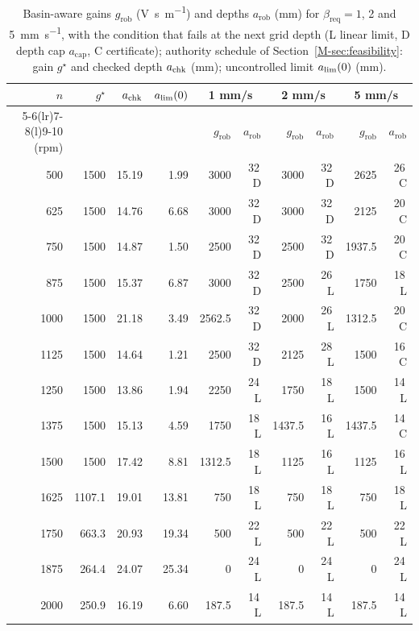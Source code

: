 \begin{table}[!htbp]
  \centering
  \caption{Basin-aware gains $g_{\mathrm{rob}}$ (\si{\volt\second\per\metre}) and depths $a_{\mathrm{rob}}$ (\si{\milli\metre}) for $\beta_{\mathrm{req}}=1$, 2 and \SI{5}{\milli\metre\per\second}, with the condition that fails at the next grid depth (L linear limit, D depth cap $a_{\mathrm{cap}}$, C certificate); authority schedule of Section~\ref{M-sec:feasibility}: gain $g^\star$ and checked depth $a_{\mathrm{chk}}$ (\si{\milli\metre}); uncontrolled limit $a_{\lim}(0)$ (\si{\milli\metre}).}
  \label{tab:supp-ba}
  \small
  \begin{tabular}{@{}rrrrrrrrrr@{}}
    \toprule
    $n$ & $g^\star$ & $a_{\mathrm{chk}}$ & $a_{\lim}(0)$ & \multicolumn{2}{c}{1 mm/s} & \multicolumn{2}{c}{2 mm/s} & \multicolumn{2}{c}{5 mm/s}\\
    \cmidrule(lr){5-6}\cmidrule(lr){7-8}\cmidrule(l){9-10}
    (rpm) & & & & $g_{\mathrm{rob}}$ & $a_{\mathrm{rob}}$ & $g_{\mathrm{rob}}$ & $a_{\mathrm{rob}}$ & $g_{\mathrm{rob}}$ & $a_{\mathrm{rob}}$\\
    \midrule
    500 & 1500 & 15.19 & 1.99 & 3000 & 32\,D & 3000 & 32\,D & 2625 & 26\,C\\
    625 & 1500 & 14.76 & 6.68 & 3000 & 32\,D & 3000 & 32\,D & 2125 & 20\,C\\
    750 & 1500 & 14.87 & 1.50 & 2500 & 32\,D & 2500 & 32\,D & 1937.5 & 20\,C\\
    875 & 1500 & 15.37 & 6.87 & 3000 & 32\,D & 2500 & 26\,L & 1750 & 18\,L\\
    1000 & 1500 & 21.18 & 3.49 & 2562.5 & 32\,D & 2000 & 26\,L & 1312.5 & 20\,C\\
    1125 & 1500 & 14.64 & 1.21 & 2500 & 32\,D & 2125 & 28\,L & 1500 & 16\,C\\
    1250 & 1500 & 13.86 & 1.94 & 2250 & 24\,L & 1750 & 18\,L & 1500 & 14\,L\\
    1375 & 1500 & 15.13 & 4.59 & 1750 & 18\,L & 1437.5 & 16\,L & 1437.5 & 14\,C\\
    1500 & 1500 & 17.42 & 8.81 & 1312.5 & 18\,L & 1125 & 16\,L & 1125 & 16\,L\\
    1625 & 1107.1 & 19.01 & 13.81 & 750 & 18\,L & 750 & 18\,L & 750 & 18\,L\\
    1750 & 663.3 & 20.93 & 19.34 & 500 & 22\,L & 500 & 22\,L & 500 & 22\,L\\
    1875 & 264.4 & 24.07 & 25.34 & 0 & 24\,L & 0 & 24\,L & 0 & 24\,L\\
    2000 & 250.9 & 16.19 & 6.60 & 187.5 & 14\,L & 187.5 & 14\,L & 187.5 & 14\,L\\

\end{tabular}
\end{table}
